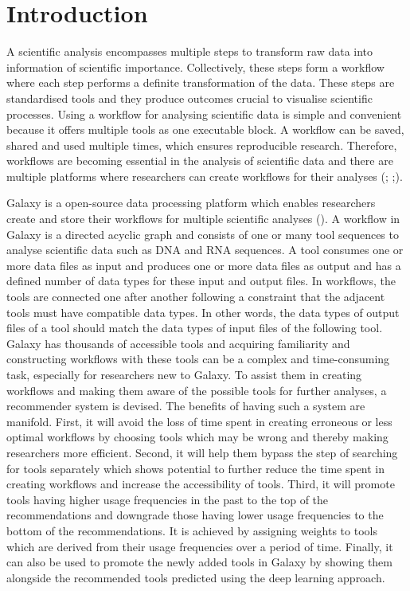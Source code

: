\documentclass{bioinfo}
\begin{document}
\maketitle

\section{Introduction}
A scientific analysis encompasses multiple steps to transform raw data into information of scientific importance. Collectively, these steps form a workflow where each step performs a definite transformation of the data. These steps are standardised tools and they produce outcomes crucial to visualise scientific processes. Using a workflow for analysing scientific data is simple and convenient because it offers multiple tools as one executable block. A workflow can be saved, shared and used multiple times, which ensures reproducible research. Therefore, workflows are becoming essential in the analysis of scientific data and there are multiple platforms where researchers can create workflows for their analyses (\cite{JeremyLeipzig}; \cite{EwelsP};\cite{Baichoo2018}).

Galaxy is a open-source data processing platform which enables researchers create and store their workflows for multiple scientific analyses (\cite{Afgan}). A workflow in Galaxy is a directed acyclic graph and consists of one or many tool sequences to analyse scientific data such as DNA and RNA sequences. A tool consumes one or more data files as input and produces one or more data files as output and has a defined number of data types for these input and output files. In workflows, the tools are connected one after another following a constraint that the adjacent tools must have compatible data types. In other words, the data types of output files of a tool should match the data types of input files of the following tool. Galaxy has thousands of accessible tools and acquiring familiarity and constructing workflows with these tools can be a complex and time-consuming task, especially for researchers new to Galaxy. To assist them in creating workflows and making them aware of the possible tools for further analyses, a recommender system is devised. The benefits of having such a system are manifold. First, it will avoid the loss of time spent in creating erroneous or less optimal workflows by choosing tools which may be wrong and thereby making researchers more efficient. Second, it will help them bypass the step of searching for tools separately which shows potential to further reduce the time spent in creating workflows and increase the accessibility of tools. Third, it will promote tools having higher usage frequencies in the past to the top of the recommendations and downgrade those having lower usage frequencies to the bottom of the recommendations. It is achieved by assigning weights to tools which are derived from their usage frequencies over a period of time. Finally, it can also be used to promote the newly added tools in Galaxy by showing them alongside the recommended tools predicted using the deep learning approach.
\end{document}

